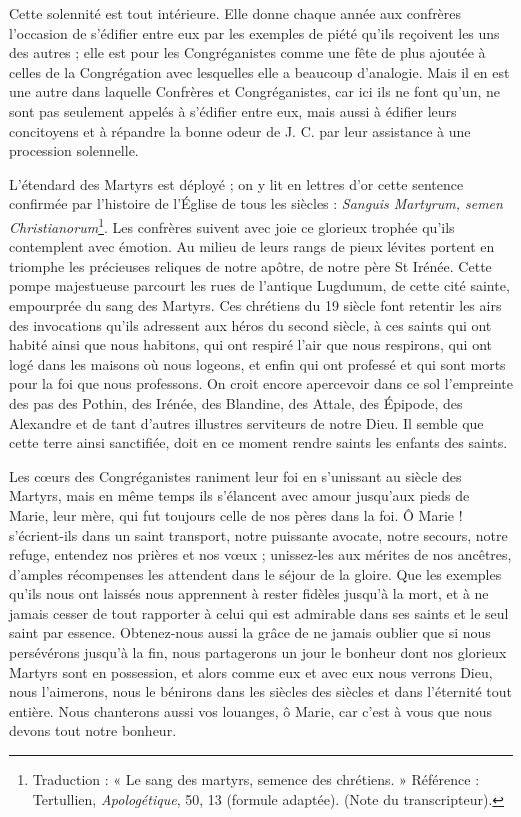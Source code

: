 Cette solennité est tout intérieure. Elle donne chaque année aux confrères l'occasion de s'édifier entre eux par les exemples de piété qu'ils reçoivent les uns des autres ; elle est pour les Congréganistes comme une fête de plus ajoutée à celles de la Congrégation avec lesquelles elle a beaucoup d'analogie. Mais il en est une autre dans laquelle Confrères et Congréganistes, car ici ils ne font qu'un, ne sont pas seulement appelés à s'édifier entre eux, mais aussi à édifier leurs concitoyens et à répandre la bonne odeur de J. C. par leur assistance à une procession solennelle.

L'étendard des Martyrs est déployé ; on y lit en lettres d'or cette sentence confirmée par l'histoire de l'Église de tous les siècles : \textit{Sanguis Martyrum, semen Christianorum}\footnote{Traduction : « Le sang des martyrs, semence des chrétiens. » Référence : Tertullien, \textit{Apologétique}, 50, 13 (formule adaptée). (Note du transcripteur).}. Les confrères suivent avec joie ce glorieux trophée qu'ils contemplent avec émotion. Au milieu de leurs rangs de pieux lévites portent en triomphe les précieuses reliques de notre apôtre, de notre père St Irénée. Cette pompe majestueuse parcourt les rues de l'antique Lugdunum, de cette cité sainte, empourprée du sang des Martyrs. Ces chrétiens
du 19 siècle font retentir les airs des invocations qu'ils adressent aux héros du second siècle, à ces saints qui ont habité ainsi que nous habitons, qui ont respiré l'air que nous respirons, qui ont logé dans les maisons où nous logeons, et enfin qui ont professé et qui sont morts pour la foi que nous professons. On croit encore apercevoir dans ce sol l'empreinte des pas des Pothin, des Irénée, des Blandine, des Attale, des Épipode, des Alexandre et de tant d'autres illustres serviteurs de notre Dieu. Il semble que cette terre ainsi sanctifiée, doit en ce moment rendre saints les enfants des saints.

Les cœurs des Congréganistes raniment leur foi en s'unissant au siècle des Martyrs, mais en même temps ils s'élancent avec amour jusqu'aux pieds de Marie, leur mère, qui fut toujours celle de nos pères dans la foi. Ô Marie ! s'écrient-ils dans un saint transport, notre puissante avocate, notre secours, notre refuge, entendez nos prières et nos vœux ; unissez-les aux mérites de nos ancêtres, d'amples récompenses les attendent dans le séjour de la gloire. Que les exemples qu'ils nous ont laissés nous apprennent à rester fidèles jusqu'à la mort, et à ne jamais cesser de tout rapporter à celui qui est admirable dans ses saints et le seul saint par essence. Obtenez-nous aussi la grâce de ne jamais oublier que si nous persévérons jusqu'à la fin, nous partagerons un jour le bonheur dont nos glorieux Martyrs sont en possession, et alors comme eux et avec eux nous verrons Dieu, nous l'aimerons, nous le bénirons dans les siècles des siècles et dans l'éternité tout entière. Nous chanterons aussi vos louanges, ô Marie, car c'est à vous que nous devons tout notre bonheur.

